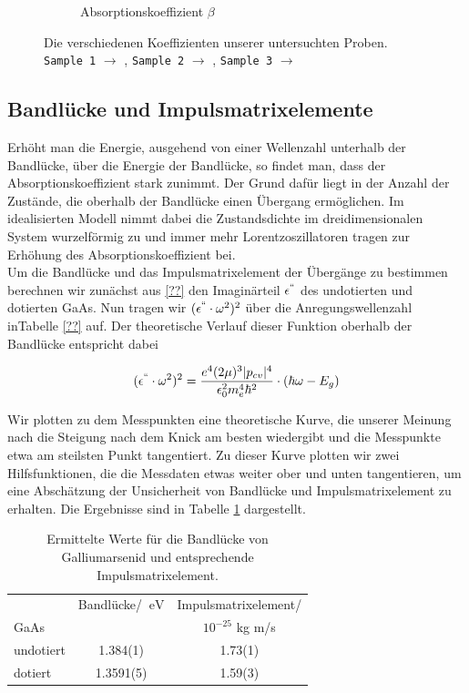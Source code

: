 \documentclass[paper=a4,fontsize=10pt,DIV=18,twocolumn,parskip=half]{scrartcl}
\numberwithin{equation}{section}    %
\begin{document}
\begin{figure}
\begin{subfigure}{\columnwidth}
        \caption{Absorptionskoeffizient $\beta$}
        \label{ab}
    \end{subfigure}
    \caption{Die verschiedenen Koeffizienten unserer untersuchten Proben.  
    \texttt{Sample 1} $\rightarrow$ ,
    \texttt{Sample 2} $\rightarrow$ , 
    \texttt{Sample 3} $\rightarrow$ }
    \label{brechzahlen}
\end{figure}

\subsection{Bandlücke und Impulsmatrixelemente}

Erhöht man die Energie, ausgehend von einer Wellenzahl unterhalb der Bandlücke, über die Energie der Bandlücke, so findet man, dass der Absorptionskoeffizient stark zunimmt. Der Grund dafür liegt in der Anzahl der Zustände, die oberhalb der Bandlücke einen Übergang ermöglichen. Im idealisierten Modell nimmt dabei die Zustandsdichte im dreidimensionalen System wurzelförmig zu und immer mehr Lorentzoszillatoren tragen zur Erhöhung des Absorptionskoeffizient bei.\\
Um die Bandlücke und das Impulsmatrixelement der Übergänge zu bestimmen berechnen wir zunächst aus \cref{??} den Imaginärteil $\epsilon^{``}$ des undotierten und dotierten GaAs. Nun tragen wir $(\epsilon^{``}\cdot \omega^2)^2$ über die Anregungswellenzahl inTabelle \ref{??} auf. Der theoretische Verlauf dieser Funktion oberhalb der Bandlücke entspricht dabei

\begin{align}
   (\epsilon^{``}\cdot \omega^2)^2=\frac{e^4 (2\mu)^3 |p_{cv}|^4}{\epsilon_0^2 m_e^4 \hbar^2} \cdot (\hbar \omega - E_g)
\end{align}

Wir plotten zu dem Messpunkten eine theoretische Kurve, die unserer Meinung nach die Steigung nach dem Knick am besten wiedergibt und die Messpunkte etwa am steilsten Punkt tangentiert. Zu dieser Kurve plotten wir zwei Hilfsfunktionen, die die Messdaten etwas weiter ober und unten tangentieren, um eine Abschätzung der Unsicherheit von Bandlücke und Impulsmatrixelement zu erhalten.
Die Ergebnisse sind in Tabelle \ref{ime} dargestellt.

\begin{table}
	\begin{center}
\begin{tabular}[r]{ l | c c }
			&Bandlücke/ $\SI{}{\eV}	$		&Impulsmatrixelement/\\
  GaAs &  & $10^{-25}$ kg m/s\\
  \hline
  undotiert & 1.384(1) & 1.73(1) \\
 dotiert & 1.3591(5) & 1.59(3)   
\end{tabular}
\caption{Ermittelte Werte für die Bandlücke von Galliumarsenid und entsprechende Impulsmatrixelement.}
  \label{ime}  
	\end{center}
\end{table}
\end{document}
